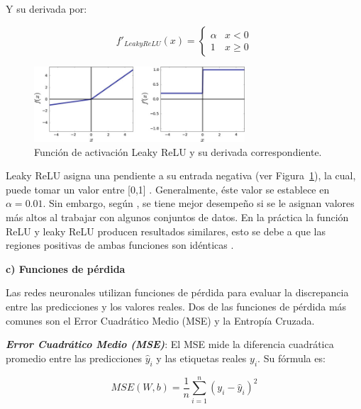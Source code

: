 Y su derivada por:

\begin{equation}
    {f}'_{Leaky ReLU}(x) = \left\{\begin{matrix}
        \alpha & x < 0         \\
        1      & x \geqslant 0
    \end{matrix}\right.
\end{equation}

\begin{figure}[H]
    \begin{center}
        \includegraphics[width=0.7\textwidth]{Images/leaky-relu.png}
    \end{center}
    \caption{Función de activación Leaky ReLU y su derivada correspondiente.}
    \label{fig:leaky-relu}
\end{figure}

Leaky ReLU asigna una pendiente a su entrada negativa (ver Figura~\ref{fig:leaky-relu}), la cual, puede tomar un valor entre [0,1] \cite{castaneda2019evaluation}. Generalmente, éste valor se establece en $ \alpha = 0.01 $. Sin embargo, según \cite{xu2015empirical}, se tiene mejor desempeño si se le asignan valores más altos al trabajar con algunos conjuntos de datos. En la práctica la función ReLU y leaky ReLU producen resultados similares, esto se debe a que las regiones positivas de ambas funciones son idénticas \cite{aghdam2017guide}.

\textbf{c) Funciones de pérdida}

Las redes neuronales utilizan funciones de pérdida para evaluar la discrepancia entre las predicciones y los valores reales. Dos de las funciones de pérdida más comunes son el Error Cuadrático Medio (MSE) y la Entropía Cruzada.

\textbf{\textit{Error Cuadrático Medio (MSE)}}: El MSE mide la diferencia cuadrática promedio entre las predicciones \(\hat{y}_i\) y las etiquetas reales \(y_i\). Su fórmula es:

\begin{equation}
    MSE(W, b) = \frac{1}{n} \sum_{i=1}^{n} (y_i - \hat{y}_i)^2
\end{equation}


